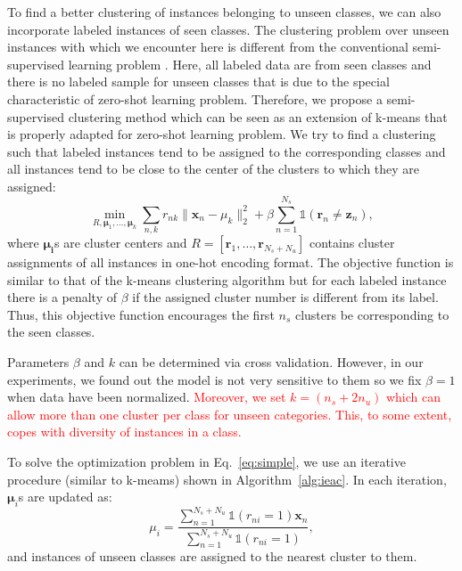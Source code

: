\documentclass[10pt,twocolumn,letterpaper]{article}
\DeclareMathOperator*{\minimize}{min}
\begin{document}
To find a better clustering of instances belonging to unseen classes,
 we can also incorporate labeled instances of seen classes.
  The clustering problem over unseen instances with which we encounter here is different from the conventional semi-supervised learning problem \cite{chapel06}.
Here, all labeled data are from seen classes and there is no labeled sample for unseen classes that is due to the special characteristic of zero-shot
 learning problem. Therefore, we propose a semi-supervised clustering method which can be seen as an extension of k-means that is properly
 adapted for zero-shot learning problem.
 We try to find a clustering such that labeled instances tend to be assigned to the corresponding classes
  and all instances tend to be close to the center of the clusters to which they are assigned:
\begin{equation} \label{eq:simple}
\minimize_{R, \boldsymbol{\mu}_1, \ldots, \boldsymbol{\mu}_k }  \sum_{n,k} r_{nk} \lVert \mathbf{x}_n - {\mu}_k \rVert_2^2 +
 \beta \sum_{n=1}^{N_s} \mathds{1}(\mathbf{r}_n \neq \mathbf{z}_n),
\end{equation}
where $\boldsymbol{\mu_i}$s are cluster centers and $R = [\mathbf{r}_1, \ldots, \mathbf{r}_{N_s + N_u } ]$ contains cluster assignments
 of all instances in one-hot encoding format.
The objective function is similar to that of the k-means clustering algorithm but for each labeled instance
 there is a penalty of $\beta$ if the assigned cluster number is different from its label. Thus, this objective function encourages
the first $n_s$ clusters be corresponding to the seen classes.

Parameters $\beta$ and $k$ can be determined via cross validation. However, in our experiments, we found out
the model is not very sensitive to them so we fix $\beta=1$
when data have been normalized. \textcolor{red}{ Moreover, we set $k =  (n_s + 2n_u)$ which
can allow more than one cluster per class for unseen categories. This, to some extent, copes with diversity of instances in a class.}

To solve the optimization problem in Eq.~\ref{eq:simple}, we use an iterative procedure (similar to k-meams) shown in Algorithm~\ref{alg:ieac}. In each iteration, $\mathbf{\mu}_i$s are updated as:
\begin{equation} \label{eq:updata_mu}
  \mu_i = \frac{\sum_{n=1}^{N_s + N_u}  \mathds{1}(r_{ni}=1)\mathbf{x}_n}{\sum_{n=1}^{N_s+N_u}\mathds{1}(r_{ni}=1)},
\end{equation}
and instances of unseen classes are assigned to the nearest cluster to them.
\end{document}
